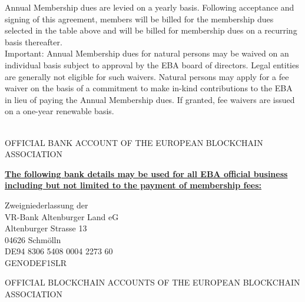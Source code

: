 \documentclass{article}
\begin{document}
Annual Membership dues are levied on a yearly basis. Following acceptance and signing of this agreement, members will be billed for the membership dues selected in the table above and will be billed for membership dues on a recurring basis thereafter.\\

Important: Annual Membership dues for natural persons may be waived on an individual basis subject to approval by the EBA board of directors. Legal entities are generally not eligible for such waivers. Natural persons may apply for a fee waiver on the basis of a commitment to make in-kind contributions to the EBA in lieu of paying the Annual Membership dues. If granted, fee waivers are issued on a one-year renewable basis.\\

  \\

\newpage

{\scshape\LARGE OFFICIAL BANK ACCOUNT OF THE EUROPEAN BLOCKCHAIN ASSOCIATION \centering \par}

\begin{center}
  \uline{\bfseries The following bank details may be used for all EBA official business including but not limited to the payment of membership fees:}\\
\end{center}

Zweigniederlassung der\\
VR-Bank Altenburger Land eG\\
Altenburger Strasse 13\\
04626 Schmölln\\

DE94 8306 5408 0004 2273 60\\

GENODEF1SLR\\

{\scshape\LARGE OFFICIAL BLOCKCHAIN ACCOUNTS OF THE EUROPEAN BLOCKCHAIN ASSOCIATION \centering \par}
\end{document}
